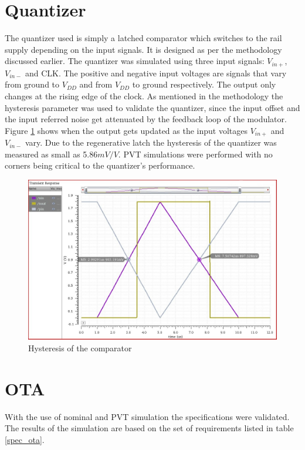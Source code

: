 \section{Quantizer}
The quantizer used is simply a latched comparator which switches to the rail supply depending on the input signals. It is designed as per the methodology discussed earlier. The quantizer was simulated using three input signals: $V_{in+}$, $V_{in-}$ and CLK. The positive and negative input voltages are signals that vary from ground to $V_{DD}$ and from $V_{DD}$ to ground respectively. The output only changes at the rising edge of the clock. As mentioned in the methodology the hysteresis parameter was used to validate the quantizer, since the input offset and the input referred noise get attenuated by the feedback loop of the modulator. Figure \ref{comparator_out} shows when the output gets updated as the input voltages $V_{in+}$ and $V_{in-}$ vary. Due to the regenerative latch the hysteresis of the quantizer was measured as small as 5.86$m V/V$. PVT simulations were performed with no corners being critical to the quantizer's performance. 

\begin{figure}[H]
\centering
\includegraphics[width=\textwidth]{images/Comperator_output.jpg}
\caption{Hysteresis of the comparator}
\label{comparator_out}
\end{figure}


\section{OTA}
With the use of nominal and PVT simulation the specifications were validated. The results of the simulation are based on the set of requirements listed in table \ref{spec_ota}. 

